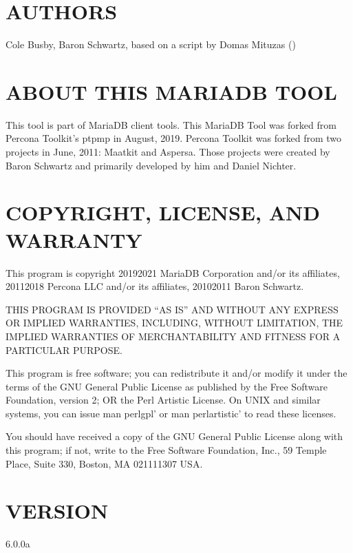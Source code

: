 \documentclass[letterpaper,10pt,english]{sphinxmanual}
\begin{document}
\section{AUTHORS}
\label{\detokenize{mariadb-stacktrace:authors}}
Cole Busby, Baron Schwartz, based on a script by Domas Mituzas ()


\section{ABOUT THIS MARIADB TOOL}
\label{\detokenize{mariadb-stacktrace:about-this-mariadb-tool}}
This tool is part of MariaDB client tools. This MariaDB Tool was forked from
Percona Toolkit’s pt\sphinxhyphen{}pmp in August, 2019. Percona Toolkit was forked from two
projects in June, 2011: Maatkit and Aspersa.  Those projects were created by
Baron Schwartz and primarily developed by him and Daniel Nichter.


\section{COPYRIGHT, LICENSE, AND WARRANTY}
\label{\detokenize{mariadb-stacktrace:copyright-license-and-warranty}}
This program is copyright 2019\sphinxhyphen{}2021 MariaDB Corporation and/or its affiliates,
2011\sphinxhyphen{}2018 Percona LLC and/or its affiliates, 2010\sphinxhyphen{}2011 Baron Schwartz.

THIS PROGRAM IS PROVIDED “AS IS” AND WITHOUT ANY EXPRESS OR IMPLIED
WARRANTIES, INCLUDING, WITHOUT LIMITATION, THE IMPLIED WARRANTIES OF
MERCHANTABILITY AND FITNESS FOR A PARTICULAR PURPOSE.

This program is free software; you can redistribute it and/or modify it under
the terms of the GNU General Public License as published by the Free Software
Foundation, version 2; OR the Perl Artistic License.  On UNIX and similar
systems, you can issue \textasciigrave{}man perlgpl’ or \textasciigrave{}man perlartistic’ to read these
licenses.

You should have received a copy of the GNU General Public License along with
this program; if not, write to the Free Software Foundation, Inc., 59 Temple
Place, Suite 330, Boston, MA  02111\sphinxhyphen{}1307  USA.


\section{VERSION}
\label{\detokenize{mariadb-stacktrace:version}}
 6.0.0a
\end{document}
